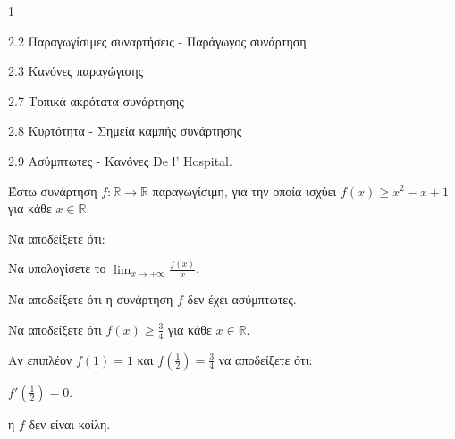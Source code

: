\begin{ylh}{1}
    \item 2.2 Παραγωγίσιμες συναρτήσεις - Παράγωγος συνάρτηση
    \item 2.3 Κανόνες παραγώγισης
    \item 2.7 Τοπικά ακρότατα συνάρτησης
    \item 2.8 Κυρτότητα - Σημεία καμπής συνάρτησης
    \item 2.9 Ασύμπτωτες - Κανόνες De l’ Hospital.
\end{ylh}
Έστω συνάρτηση $f: \mathbb{R} \to \mathbb{R}$ παραγωγίσιμη, για την οποία ισχύει $f(x) \geq x^2 - x + 1$ για κάθε $x \in \mathbb{R}$.
\begin{alist}
    \item Να αποδείξετε ότι:
    \begin{rlist}
        \item Να υπολογίσετε το $\lim_{x \to +\infty} \frac{f(x)}{x}$. 
        \item Να αποδείξετε ότι η συνάρτηση $f$ δεν έχει ασύμπτωτες. 
        \item Να αποδείξετε ότι $f(x) \geq \frac{3}{4}$ για κάθε $x \in \mathbb{R}$. 
    \end{rlist}
    \item Αν επιπλέον $f(1)=1$ και $f\left(\frac{1}{2}\right)=\frac{3}{4}$ να αποδείξετε ότι:
    \begin{rlist}
        \item $f'\left(\frac{1}{2}\right)=0$. 
        \item η $f$ δεν είναι κοίλη. 
    \end{rlist}
\end{alist}